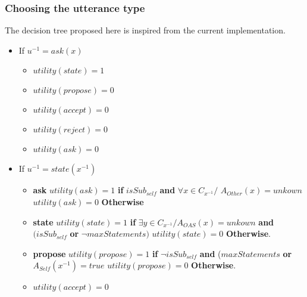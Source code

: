 \documentclass{article}
\begin{document}
\subsubsection{Choosing the utterance type}
The decision tree proposed here is inspired from the current implementation. 

\begin{itemize}
	\item If $u ^{-1}=ask (x)$ 
	\begin{itemize}
		\item $utility(state) = 1$
		\item $utility(propose) = 0$
		\item $utility(accept) = 0$
		\item $utility(reject) = 0$		
		\item $utility(ask) = 0$
		\\
	\end{itemize}
	
	\item If $u ^{-1}=state(x^{-1})$
	\begin{itemize}
		\item\textbf{ask}
		\subitem $utility(ask) = 1$ \textbf{ if } $ isSub_{self}$ \textbf{ and } {$\forall x \in C_{x^{-1}} /$ $ A_{Other} (x) = unkown$ }
		\subitem $utility(ask) = 0$ \textbf{Otherwise}
		
		\item \textbf{state}
		\subitem $utility(state) = 1$ \textbf{ if } $ \exists y \in C_{x^{-1}} / A_{OAS} (x) = unkown$ \textbf{ and } $ (isSub_{self}$  \textbf{ or } $\neg maxStatements)$
		\subitem $utility(state) = 0$ \textbf{Otherwise}.
		
		\item \textbf{propose}
		\subitem $utility(propose) = 1$ \textbf{ if } $\neg isSub_{self}$ \textbf{ and } ($maxStatements$ \textbf{ or } $A_{Self} (x^{-1}) = true$
		\subitem $utility(propose) = 0$ \textbf{Otherwise}.
	
		\item $utility(accept) = 0$
		

\end{itemize}
\end{itemize}
\end{document}

